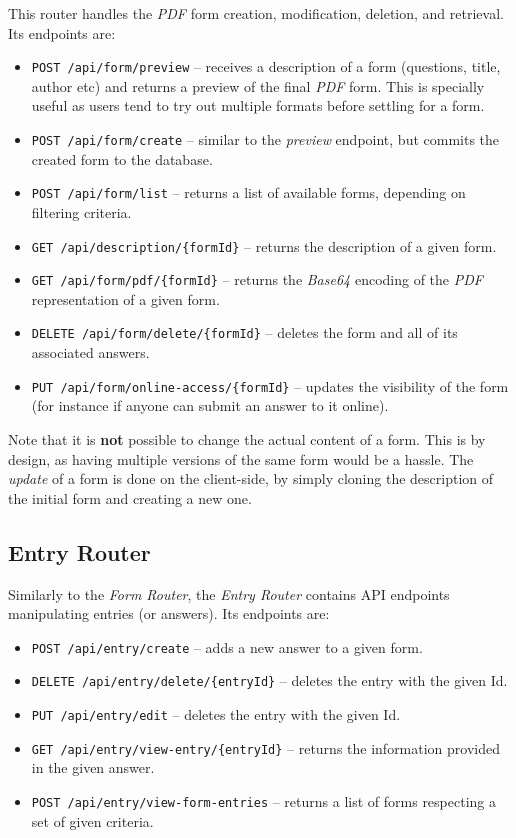 \documentclass[11pt, a4paper]{report}
\def\code#1{\texttt{#1}}
\begin{document}
This router handles the \textit{PDF} form creation, modification, deletion, and retrieval. Its endpoints are:
\begin{itemize}
    \item \code{POST /api/form/preview} -- receives a description of a form (questions, title, author etc) and returns a preview of the final \textit{PDF} form. This is specially useful as users tend to try out multiple formats before settling for a form.
    \item \code{POST /api/form/create} -- similar to the \textit{preview} endpoint, but commits the created form to the database.
    \item \code{POST /api/form/list} -- returns a list of available forms, depending on filtering criteria.
    \item \code{GET /api/description/\{formId\}} -- returns the description of a given form.
    \item \code{GET /api/form/pdf/\{formId\}} -- returns the \textit{Base64} encoding of the \textit{PDF} representation of a given form.
    \item \code{DELETE /api/form/delete/\{formId\}} -- deletes the form and all of its associated answers.
    \item \code{PUT /api/form/online-access/\{formId\}} -- updates the visibility of the form (for instance if anyone can submit an answer to it online).
\end{itemize}

Note that it is \textbf{not} possible to change the actual content of a form. This is by design, as having multiple versions of the same form would be a hassle. The \textit{update} of a form is done on the client-side, by simply cloning the description of the initial form and creating a new one.

\subsection{Entry Router}

Similarly to the \textit{Form Router}, the \textit{Entry Router} contains API endpoints manipulating entries (or answers). Its endpoints are:
\begin{itemize}
    \item \code{POST /api/entry/create} -- adds a new answer to a given form.
    \item \code{DELETE /api/entry/delete/\{entryId\}} -- deletes the entry with the given Id.
    \item \code{PUT /api/entry/edit} -- deletes the entry with the given Id.
    \item \code{GET /api/entry/view-entry/\{entryId\}} -- returns the information provided in the given answer.
    \item \code{POST /api/entry/view-form-entries} -- returns a list of forms respecting a set of given criteria.
\end{itemize}
\end{document}
